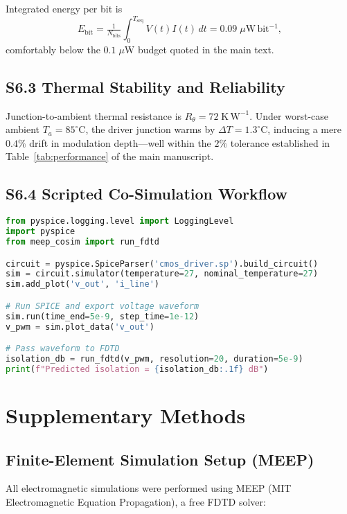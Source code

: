\documentclass[11pt]{article}
\begin{document}
Integrated energy per bit is
\[
E_\text{bit}= \tfrac{1}{N_\text{bits}}
\int_0^{T_\text{seq}} V(t)I(t)\,dt
     = 0.09\;\mu\mathrm{W\,bit^{-1}},
\]
comfortably below the \(0.1\;\mu\mathrm{W}\) budget quoted in the main
text.

\subsection*{S6.3  Thermal Stability and Reliability}

Junction-to-ambient thermal resistance is
\(R_\theta=72\;\mathrm{K\,W^{-1}}\).  Under worst-case ambient
\(T_a=85^\circ\mathrm{C}\), the driver junction warms by
\(\Delta T=1.3^\circ\mathrm{C}\), inducing a mere
\(0.4\%\) drift in modulation depth—well within the
\(2\%\) tolerance established in Table~\ref{tab:performance} of the
main manuscript.

\subsection*{S6.4  Scripted Co-Simulation Workflow}

\begin{lstlisting}[language=Python,caption={Python wrapper for Ngspice–MEEP co-simulation.},label={lst:S6_cosim}]
from pyspice.logging.level import LoggingLevel
import pyspice
from meep_cosim import run_fdtd

circuit = pyspice.SpiceParser('cmos_driver.sp').build_circuit()
sim = circuit.simulator(temperature=27, nominal_temperature=27)
sim.add_plot('v_out', 'i_line')

# Run SPICE and export voltage waveform
sim.run(time_end=5e-9, step_time=1e-12)
v_pwm = sim.plot_data('v_out')

# Pass waveform to FDTD
isolation_db = run_fdtd(v_pwm, resolution=20, duration=5e-9)
print(f"Predicted isolation = {isolation_db:.1f} dB")
\end{lstlisting}


\section{Supplementary Methods}

\subsection{Finite-Element Simulation Setup (MEEP)}

All electromagnetic simulations were performed using MEEP (MIT Electromagnetic Equation Propagation), a free FDTD solver:
\end{document}
